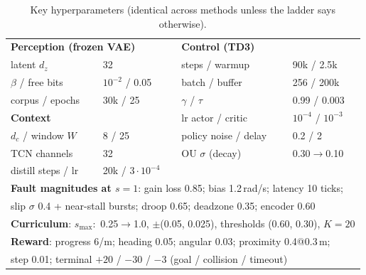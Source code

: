 \documentclass[journal]{IEEEtran}
\begin{document}
\begin{table}[!t]
\centering
\caption{Key hyperparameters (identical across methods unless the ladder
says otherwise).}
\label{tab:hyper}
\footnotesize
\setlength{\tabcolsep}{4pt}
\begin{tabular}{llll}
\toprule
\multicolumn{2}{l}{\textbf{Perception (frozen VAE)}} &
\multicolumn{2}{l}{\textbf{Control (TD3)}}\\
latent $d_z$ & 32 & steps / warmup & 90k / 2.5k \\
$\beta$ / free bits & $10^{-2}$ / 0.05 & batch / buffer & 256 / 200k \\
corpus / epochs & 30k / 25 & $\gamma$ / $\tau$ & 0.99 / 0.003 \\
\multicolumn{2}{l}{\textbf{Context}} & lr actor / critic & $10^{-4}$ /
$10^{-3}$ \\
$d_c$ / window $W$ & 8 / 25 & policy noise / delay & 0.2 / 2 \\
TCN channels & 32 & OU $\sigma$ (decay) & 0.30$\to$0.10 \\
distill steps / lr & 20k / $3{\cdot}10^{-4}$ & & \\
\midrule
\multicolumn{4}{l}{\textbf{Fault magnitudes at $s{=}1$}: gain loss 0.85;
bias 1.2\,rad/s; latency 10 ticks;}\\
\multicolumn{4}{l}{slip $\sigma$ 0.4 + near-stall bursts; droop 0.65;
deadzone 0.35; encoder 0.60}\\
\multicolumn{4}{l}{\textbf{Curriculum}: $s_{\max}{:}$ 0.25$\to$1.0, $\pm$(0.05,
0.025), thresholds (0.60, 0.30), $K{=}20$}\\
\multicolumn{4}{l}{\textbf{Reward}: progress 6/m; heading 0.05; angular 0.03;
proximity 0.4@0.3\,m;}\\
\multicolumn{4}{l}{step 0.01; terminal $+20$ / $-30$ / $-3$
(goal / collision / timeout)}\\
\bottomrule
\end{tabular}
\end{table}
\end{document}
